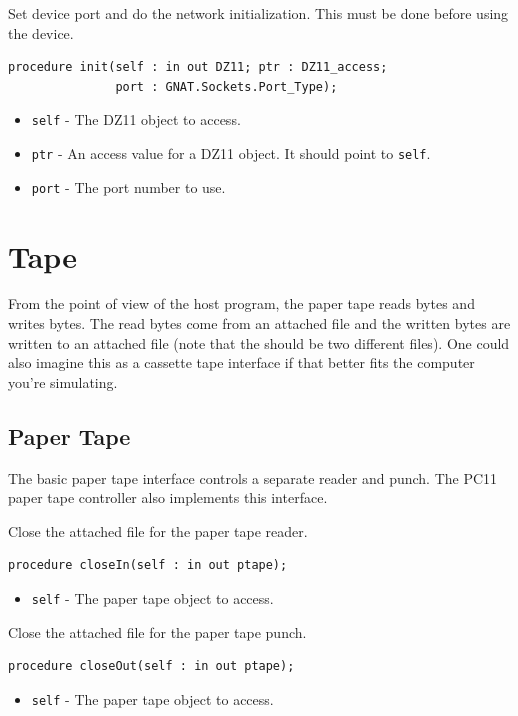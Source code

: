 \documentclass[10pt, openany]{book}
\newcommand{\keyword}[1]{\texttt{#1}}
\begin{document}
Set device port and do the network initialization.
This must be done before using the device.
\begin{lstlisting}
procedure init(self : in out DZ11; ptr : DZ11_access;
               port : GNAT.Sockets.Port_Type);
\end{lstlisting}
\begin{itemize}
  \item \keyword{self} - The DZ11 object to access.
  \item \keyword{ptr} - An access value for a DZ11 object.  It should point to \keyword{self}.
  \item \keyword{port} - The port number to use.
\end{itemize}

\section{Tape}
From the point of view of the host program, the paper tape reads bytes and writes bytes.
The read bytes come from an attached file and the written bytes are written to an attached file (note that the should be two different files).
One could also imagine this as a cassette tape interface if that better fits the computer you're simulating.

\subsection{Paper Tape}
The basic paper tape interface controls a separate reader and punch.  The PC11 paper tape controller also implements this interface.

Close the attached file for the paper tape reader.
\begin{lstlisting}
procedure closeIn(self : in out ptape);
\end{lstlisting}
\begin{itemize}
  \item \keyword{self} - The paper tape object to access.
\end{itemize}

Close the attached file for the paper tape punch.
\begin{lstlisting}
procedure closeOut(self : in out ptape);
\end{lstlisting}
\begin{itemize}
  \item \keyword{self} - The paper tape object to access.
\end{itemize}
\end{document}
